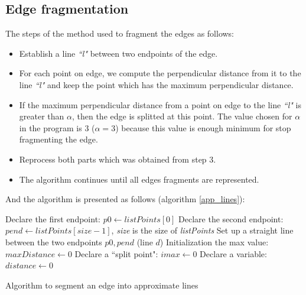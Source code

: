 \subsection{Edge fragmentation}
The steps of the method used to fragment the edges as follows:
\begin{itemize}
\item Establish a line \textit{``l"} between two endpoints of the edge.
\item For each point on edge, we compute the perpendicular distance from it to the line \textit{``l"} and keep the point which has the maximum perpendicular distance.
\item If the maximum perpendicular distance from a point on edge to the line \textit{``l"} is greater than $\alpha$, then the edge is splitted at this point. The value chosen for $\alpha$ in the program is 3 ($\alpha = 3$) because this value is enough minimum for stop fragmenting the edge.
\item Reprocess both parts which was obtained from step 3.
\item The algorithm continues until all edges fragments are represented.
\end{itemize}
And the algorithm is presented as follows (algorithm \ref{app_lines}):\\
\IncMargin{1em}
\begin{algorithm}[H]
\Indm 
{}
\SetAlgoLined
{}
\Indp
Declare the first endpoint: $p0 \leftarrow listPoints[0]$\;
Declare the second endpoint: $pend \leftarrow listPoints[size - 1]$, \textit{size} is the size of \textit{listPoints}\;
Set up a straight line between the two endpoints $p0, pend$ (line $d$)\;
Initialization the max value: $maxDistance  \leftarrow 0 $\;
Declare a ``split point": $imax \leftarrow 0$ \; 
Declare a variable: $distance \leftarrow 0$\;

\caption{Algorithm to segment an edge into approximate lines}
\label{app_lines}
\end{algorithm}\DecMargin{1em}
